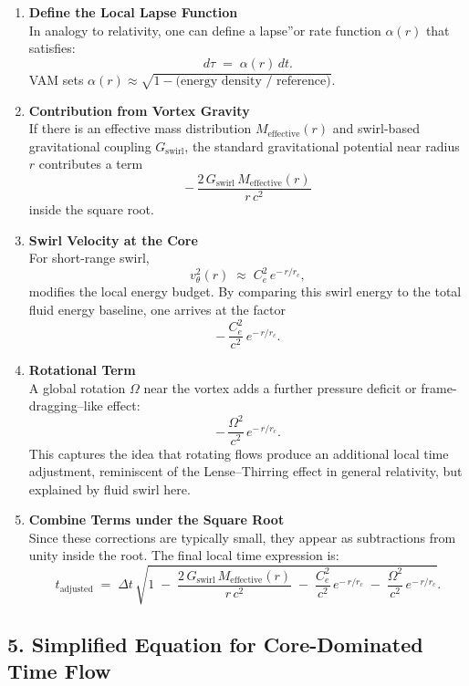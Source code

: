 \documentclass[a4paper,12pt]{article}
\begin{document}
\begin{enumerate}
    \item \textbf{Define the Local Lapse Function} \\
    In analogy to relativity, one can define a \grqq lapse\textquotedblright or rate function \(\alpha(r)\) that satisfies:
    \[
        d\tau
        \;=\;
        \alpha(r)\,dt.
    \]
    VAM sets \(\alpha(r)\approx \sqrt{1 - \text{(energy density / reference)}}\).
    \item \textbf{Contribution from Vortex Gravity} \\
    If there is an effective mass distribution \(M_\text{effective}(r)\) and swirl-based gravitational coupling \(G_\text{swirl}\), the standard gravitational potential near radius \(r\) contributes a term
    \[
        -\,\frac{2\,G_\text{swirl}\,M_\text{effective}(r)}{r\,c^2}
    \]
    inside the square root.
    \item \textbf{Swirl Velocity at the Core} \\
    For short-range swirl,
    \[
        v_{\theta}^2(r)
        \;\approx\;
        C_e^2\, e^{-\,r/r_c},
    \]
    modifies the local energy budget. By comparing this swirl energy to the total fluid energy baseline, one arrives at the factor
    \[
        -\,\frac{C_e^2}{c^2}\, e^{-\,r/r_c}.
    \]
    \item \textbf{Rotational Term} \\
    A global rotation \(\Omega\) near the vortex adds a further pressure deficit or frame-dragging–like effect:
    \[
        -\,\frac{\Omega^2}{c^2}\, e^{-\,r/r_c}.
    \]
    This captures the idea that rotating flows produce an additional local time adjustment, reminiscent of the Lense–Thirring effect in general relativity, but explained by fluid swirl here.
    \item \textbf{Combine Terms under the Square Root} \\
    Since these corrections are typically small, they appear as subtractions from unity inside the root. The final local time expression is:
    \[
        t_\text{adjusted}
        \;=\;
        \Delta t \,\sqrt{
            1
            \;-\;
            \frac{2\,G_\text{swirl}\,M_\text{effective}(r)}{r\,c^2}
            \;-\;
            \frac{C_e^2}{c^2}\, e^{-\,r/r_c}
            \;-\;
            \frac{\Omega^2}{c^2}\, e^{-\,r/r_c}
        }.
    \]
\end{enumerate}

\subsection*{5. Simplified Equation for Core-Dominated Time Flow}
\end{document}
